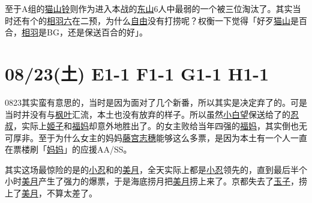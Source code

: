 至于A组的\uline{猫山铃}则作为进入本战的\uline{东山}6人中最弱的一个被三位淘汰了。其实当时还有个的\uline{相羽六}在二预，为什么\uline{自由}没有打捞呢？权衡一下觉得「好歹\uline{猫山}是百合，\uline{相羽}是BG，还是保送百合的好」。

\section{08/23(土) E1-1 F1-1 G1-1 H1-1}


0823其实蛮有意思的，当时是因为面对了几个新番，所以其实是决定弃了的。可是当时并没有与\uline{枫叶}汇流，本土也没有放弃的样子。所以虽然\uline{小白望}保送给了的\uline{忍叔}，实际上\uline{姬子}和\uline{福妈}却意外地胜出了。的女主败给当年四强的\uline{福妈}，其实倒也无可厚非。至于为什么女主的妈妈\uline{藤宫志穗}能够这么多票，是因为本土有一个人一直在票楼刷「\uline{妈妈}」的应援AA/SS。

其实这场最惊险的是的\uline{小忍}和的\uline{美月}，全天实际上都是\uline{小忍}领先的，直到最后半个小时\uline{美月}产生了强力的爆票，于是海底捞月把\uline{美月}捞上来了。京都失去了\uline{玉子}，捞上了\uline{美月}，不算太差了。

